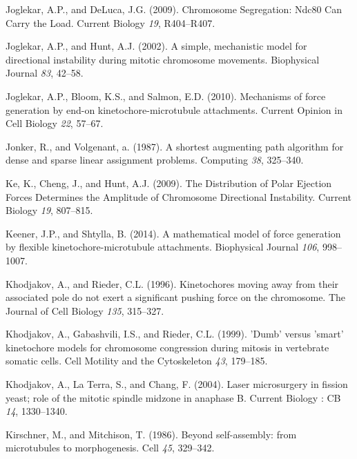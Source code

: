 \documentclass[12pt,a4paper,twoside,openright]{book}
\begin{document}
Joglekar, A.P., and DeLuca, J.G. (2009). Chromosome Segregation: Ndc80
Can Carry the Load. Current Biology \emph{19}, R404--R407.

Joglekar, A.P., and Hunt, A.J. (2002). A simple, mechanistic model for
directional instability during mitotic chromosome movements. Biophysical
Journal \emph{83}, 42--58.

Joglekar, A.P., Bloom, K.S., and Salmon, E.D. (2010). Mechanisms of
force generation by end-on kinetochore-microtubule attachments. Current
Opinion in Cell Biology \emph{22}, 57--67.

Jonker, R., and Volgenant, a. (1987). A shortest augmenting path
algorithm for dense and sparse linear assignment problems. Computing
\emph{38}, 325--340.

Ke, K., Cheng, J., and Hunt, A.J. (2009). The Distribution of Polar
Ejection Forces Determines the Amplitude of Chromosome Directional
Instability. Current Biology \emph{19}, 807--815.

Keener, J.P., and Shtylla, B. (2014). A mathematical model of force
generation by flexible kinetochore-microtubule attachments. Biophysical
Journal \emph{106}, 998--1007.

Khodjakov, A., and Rieder, C.L. (1996). Kinetochores moving away from
their associated pole do not exert a significant pushing force on the
chromosome. The Journal of Cell Biology \emph{135}, 315--327.

Khodjakov, A., Gabashvili, I.S., and Rieder, C.L. (1999). 'Dumb' versus
'smart' kinetochore models for chromosome congression during mitosis in
vertebrate somatic cells. Cell Motility and the Cytoskeleton \emph{43},
179--185.

Khodjakov, A., La Terra, S., and Chang, F. (2004). Laser microsurgery in
fission yeast; role of the mitotic spindle midzone in anaphase B.
Current Biology : CB \emph{14}, 1330--1340.

Kirschner, M., and Mitchison, T. (1986). Beyond self-assembly: from
microtubules to morphogenesis. Cell \emph{45}, 329--342.
\end{document}
